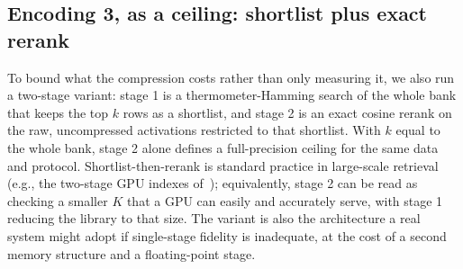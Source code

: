 \subsection{Encoding 3, as a ceiling: shortlist plus exact rerank}
\label{subsec:TwoStage}
To bound what the compression costs rather than only measuring it, we
also run a two-stage variant: stage 1 is a thermometer-Hamming search of
the whole bank that keeps the top $k$ rows as a shortlist, and stage 2
is an exact cosine rerank on the raw, uncompressed activations
restricted to that shortlist. With $k$ equal to the whole bank, stage 2
alone defines a full-precision ceiling for the same data and protocol.
Shortlist-then-rerank is standard practice in large-scale retrieval
(e.g., the two-stage GPU indexes of~\cite{faisscuvs2025});
equivalently, stage 2 can be read as checking a smaller $K$ that a
GPU can easily and accurately serve, with stage 1 reducing the
library to that size. The variant is also the architecture a real
system might adopt if
single-stage fidelity is inadequate, at the cost of a second memory
structure and a floating-point stage.
